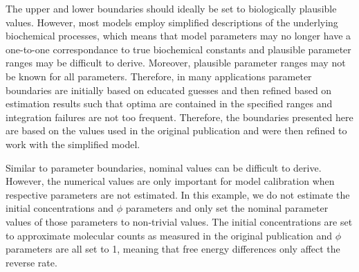 \documentclass[11pt]{article}
\begin{document}
The upper and lower boundaries should ideally be set to biologically
plausible values. However, most models employ simplified descriptions of
the underlying biochemical processes, which means that model parameters
may no longer have a one-to-one correspondance to true biochemical
constants and plausible parameter ranges may be difficult to derive.
Moreover, plausible parameter ranges may not be known for all
parameters. Therefore, in many applications parameter boundaries are
initially based on educated guesses and then refined based on estimation
results such that optima are contained in the specified ranges and
integration failures are not too frequent. Therefore, the boundaries
presented here are based on the values used in the original publication
\cite{2754712/I4JQ4DMV} and were then refined to work with the
simplified model.

Similar to parameter boundaries, nominal values can be difficult to
derive. However, the numerical values are only important for model
calibration when respective parameters are not estimated. In this
example, we do not estimate the initial concentrations and \(\phi\)
parameters and only set the nominal parameter values of those parameters
to non-trivial values. The initial concentrations are set to approximate
molecular counts as measured in the original publication and \(\phi\)
parameters are all set to 1, meaning that free energy differences only
affect the reverse rate.
\end{document}

